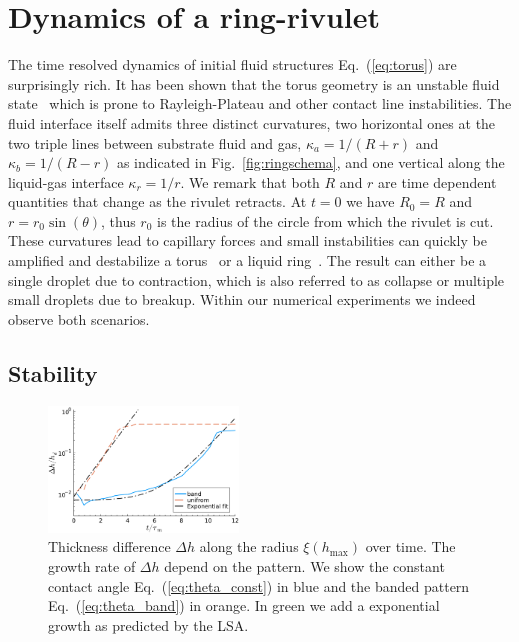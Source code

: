 \documentclass[twoside,twocolumn,9pt]{article}
\begin{document}
\section{Dynamics of a ring-rivulet}
\label{sec:dynamics}
The time resolved dynamics of initial fluid structures Eq.~(\ref{eq:torus}) are surprisingly rich.
It has been shown that the torus geometry is an unstable fluid state~\cite{gonzalezStabilityLiquidRing2013, mehrabianCapillaryBreakupLiquid2013} which is prone to Rayleigh-Plateau and other contact line instabilities. 
The fluid interface itself admits three distinct curvatures, two horizontal ones at the two triple lines between substrate fluid and gas, $\kappa_a = 1/(R+r)$ and $\kappa_b = 1/(R-r)$ as indicated in Fig.~\ref{fig:ringschema}, and one vertical along the liquid-gas interface $\kappa_r = 1/r$.
We remark that both $R$ and $r$ are time dependent quantities that change as the rivulet retracts.
At $t=0$ we have $R_0 = R$ and $r = r_0\sin(\theta)$, thus $r_0$ is the radius of the circle from which the rivulet is cut.
These curvatures lead to capillary forces and small instabilities can quickly be amplified and destabilize a torus~\cite{mehrabianCapillaryBreakupLiquid2013} or a liquid ring~\cite{gonzalezStabilityLiquidRing2013}. 
The result can either be a single droplet due to contraction, which is also referred to as collapse or multiple small droplets due to breakup.
Within our numerical experiments we indeed observe both scenarios.

\subsection{Stability}\label{subsec:stability}
\begin{figure}
    \centering
    \includegraphics[width=0.45\textwidth]{assets/growthRate_R180_r20_th40.pdf}
    \caption{Thickness difference $\Delta h$ along the radius $\xi(h_{\max})$ over time.
    The growth rate of $\Delta h$ depend on the pattern. 
    We show the constant contact angle Eq.~(\ref{eq:theta_const}) in blue and the banded pattern Eq.~(\ref{eq:theta_band}) in orange.
    In green we add a exponential growth as predicted by the LSA.}
    \label{fig:first_growth}
\end{figure}
\end{document}
